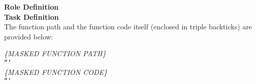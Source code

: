\begin{tcolorbox}[colback=orange!5!white, colframe=orange!95!white, colbacktitle=orange!95!white, title=Prompt for Function Description Generation]
\small
    \textbf{Role Definition}\\
    \textbf{Task Definition}\\
    The function path and the function code itself (enclosed in triple backticks) are provided below:

    \textit{\{MASKED FUNCTION PATH\}}\\
    \texttt{```}\\
    \textit{\{MASKED FUNCTION CODE\}}\\
    \texttt{```}
    \vspace{-7pt}
\normalsize
\end{tcolorbox}
\begin{minipage}{\linewidth}
\label{box:func_desc_prompt}
\end{minipage}